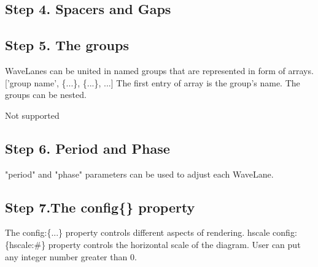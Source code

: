 \documentclass{article}
\begin{document}
\subsection{Step 4. Spacers and Gaps}



\begin{tikzpicture}[thick]
    
\end{tikzpicture}


\subsection{Step 5. The groups}
WaveLanes can be united in named groups that are represented in form of arrays. 
['group name', \{...\}, \{...\}, ...] The first entry of array is the group's name. The groups can be nested. 



%     

Not supported

\subsection{Step 6. Period and Phase}

"period" and "phase" parameters can be used to adjust each WaveLane. 




\begin{tikzpicture}[thick]
    
\end{tikzpicture}

\subsection{ Step 7.The config\{\} property}

The config:\{...\} property controls different aspects of rendering.
hscale
config:\{hscale:\#\} property controls the horizontal scale of the diagram. User can put any integer number greater than 0. 


\end{document}
